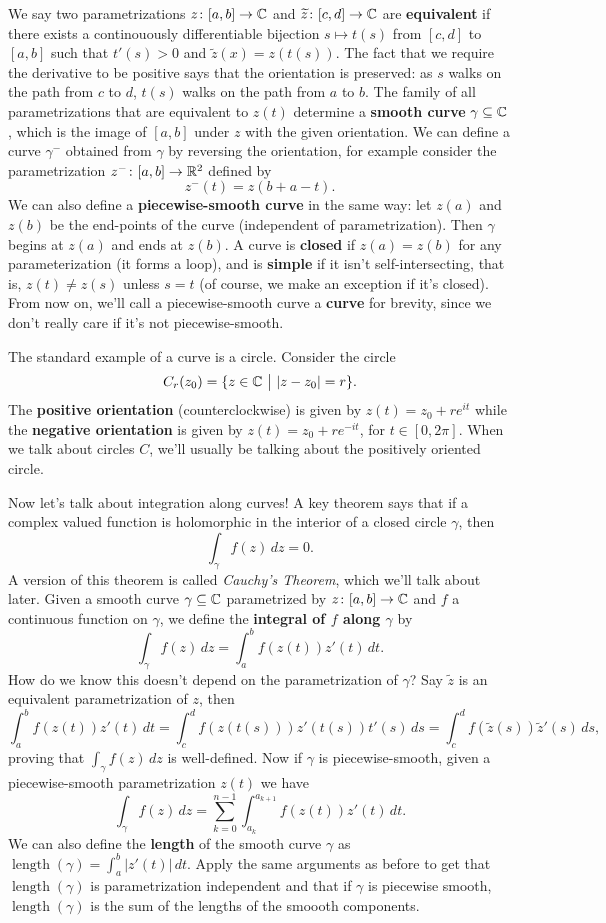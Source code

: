 We say two parametrizations $z \colon [a,b] \to \mathbb{C}$ and $\widetilde z \colon [c,d] \to \mathbb{C}$ are \textbf{equivalent} if there exists a continouously differentiable bijection $s\mapsto t(s)$ from $[c,d]$ to $[a,b]$ such that $t'(s)>0$ and $\widetilde z(x)=z(t(s))$. The fact that we require the derivative to be positive says that the orientation is preserved: as $s$ walks on the path from $c$ to $d$, $t(s)$ walks on the path from $a$ to $b$. The family of all parametrizations that are equivalent to $z(t)$ determine a \textbf{smooth curve} $\gamma\subseteq \mathbb{C}$, which is the image of $[a,b]$ under $z$ with the given orientation. We can define a curve $\gamma^-$ obtained from $\gamma$ by reversing the orientation, for example consider the parametrization $z^- \colon [a,b] \to \mathbb{R}^2$ defined by \[
    z^-(t)=z(b+a-t).
\] We can also define a \textbf{piecewise-smooth curve} in the same way: let $z(a)$ and $z(b)$ be the end-points of the curve (independent of parametrization). Then $\gamma$ begins at $z(a)$ and ends at $z(b)$. A curve is \textbf{closed} if $z(a)=z(b)$ for any parameterization (it forms a loop), and is \textbf{simple} if it isn't self-intersecting, that is, $z(t)\neq z(s)$ unless $s=t$ (of course, we make an exception if it's closed). From now on, we'll call a piecewise-smooth curve a \textbf{curve} for brevity, since we don't really care if it's not piecewise-smooth.
\begin{example}
    The standard example of a curve is a circle. Consider the circle \[
        C_r(z_0)=\{z\in \mathbb{C} \ \big|\ |z-z_0|=r\} .
    \] The \textbf{positive orientation} (counterclockwise) is given by $z(t)=z_0+re^{it}$ while the \textbf{negative orientation} is given by $z(t)=z_0+re^{-it}$, for $t\in [0,2\pi]$. When we talk about circles $C$, we'll usually be talking about the positively oriented circle.
\end{example}
\orbreak
Now let's talk about integration along curves! A key theorem says that if a complex valued function is holomorphic in the interior of a closed circle $\gamma$, then \[
    \int _{\gamma}f(z) \, dz=0.
\] A version of this theorem is called \emph{Cauchy's Theorem}, which we'll talk about later. Given a smooth curve $\gamma\subseteq\mathbb{C}$ parametrized by $z \colon [a,b] \to \mathbb{C}$ and $f$ a continuous function on $\gamma$, we define the \textbf{integral of $f$ along $\gamma$} by \[
\int _{\gamma}f(z) \, dz = \int_{a}^{b} f(z(t))z'(t) \, dt.
\] How do we know this doesn't depend on the parametrization of $\gamma$? Say $\widetilde z$ is an equivalent parametrization of $z$, then \[
\int_{a}^{b} f(z(t))z'(t) \, dt = \int_{c}^{d} f(z(t(s)))z'(t(s))t'(s) \, ds=\int_{c}^{d} f(\widetilde z(s))\widetilde z'(s) \, ds,
\] proving that $\int _{\gamma}f(z) \, dz$ is well-defined. Now if $\gamma$ is piecewise-smooth, given a piecewise-smooth parametrization $z(t)$ we have \[
\int _{\gamma}f(z) \, dz=\sum_{k=0}^{n-1} \int_{a_k}^{a_{k+1}}f(z(t))z'(t)  \, dt. 
\] We can also define the \textbf{length} of the smooth curve $\gamma$ as $\operatorname{length}(\gamma)=\int_{a}^{b} |z'(t)| \, dt$. Apply the same arguments as before to get that $\operatorname{length}(\gamma)$ is parametrization independent and that if $\gamma$ is piecewise smooth, $\operatorname{length}(\gamma)$ is the sum of the lengths of the smoooth components.

